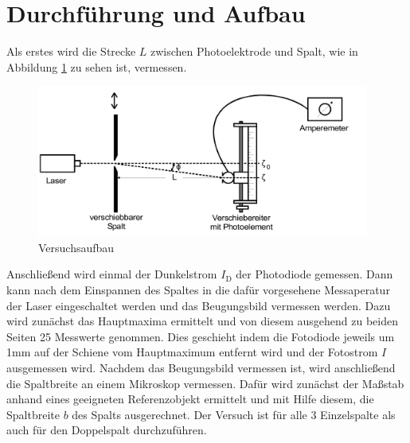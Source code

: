 \section{Durchführung und Aufbau}
\label{sec:Durchführung}
Als erstes wird die Strecke $L$ zwischen Photoelektrode und Spalt, wie in Abbildung \ref{fig:aufbau} zu sehen ist, vermessen.
\begin{figure}
  \centering
  \includegraphics[height=5cm]{picture/Aufbau.png}
  \caption{Versuchsaufbau \cite[6]{sample}}
  \label{fig:aufbau}
\end{figure}
Anschließend wird einmal der Dunkelstrom $I_\text{D}$ der Photodiode gemessen. Dann kann nach dem Einspannen des Spaltes in die dafür vorgesehene Messaperatur der Laser eingeschaltet werden und das Beugungsbild vermessen werden. Dazu wird zunächst das Hauptmaxima ermittelt und von diesem ausgehend zu beiden Seiten 25 Messwerte genommen. Dies geschieht indem die Fotodiode jeweils um 1mm auf der Schiene vom Hauptmaximum entfernt wird und der Fotostrom $I$ ausgemessen wird.
Nachdem das Beugungsbild vermessen ist, wird anschließend die Spaltbreite an einem Mikroskop vermessen. Dafür wird zunächst der Maßstab anhand eines geeigneten Referenzobjekt ermittelt und mit Hilfe diesem, die Spaltbreite $b$ des Spalts ausgerechnet. Der Versuch ist für alle 3 Einzelspalte als auch für den Doppelspalt durchzuführen.
